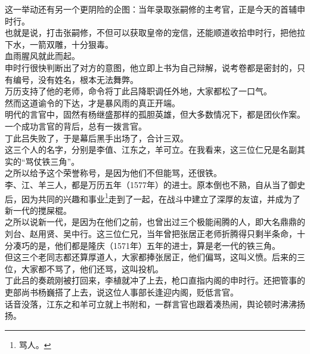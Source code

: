 \begin{multicols}{\theparacolNo}
这一举动还有另一个更阴险的企图：当年录取张嗣修的主考官，正是今天的首辅申时行。\\

也就是说，打击张嗣修，不但可以获取皇帝的宠信，还能顺道收拾申时行，把他拉下水，一箭双雕，十分狠毒。\\

血雨腥风就此而起。\\

申时行很快判断出了对方的意图，他立即上书为自己辩解，说考卷都是密封的，只有编号，没有姓名，根本无法舞弊。\\

万历支持了他的老师，命令将丁此吕降职调任外地，大家都松了一口气。\\

然而这道谕令的下达，才是暴风雨的真正开端。\\

明代的言官中，固然有杨继盛那样的孤胆英雄，但大多数情况下，都是团伙作案。一个成功言官的背后，总有一拨言官。\\

丁此吕失败了，于是幕后黑手出场了，合计三双。\\

这三个人的名字，分别是李值、江东之，羊可立。在我看来，这三位仁兄是名副其实的“骂仗铁三角”。\\

之所以给予这个荣誉称号，是因为他们不但能骂，还很铁。\\

李、江、羊三人，都是万历五年（1577年）的进士。原本倒也不熟，自从当了御史后，因为共同的兴趣和事业\footnote{骂人。}走到了一起，在战斗中建立了深厚的友谊，并成为了新一代的搅屎棍。\\

之所以说新一代，是因为在他们之前，也曾出过三个极能闹腾的人，即大名鼎鼎的刘台、赵用贤、吴中行。这三位仁兄，当年曾把张居正老师折腾得只剩半条命，十分凑巧的是，他们都是隆庆（1571年）五年的进士，算是老一代的铁三角。\\

但这三个老同志都还算厚道人，大家都捧张居正，他们偏骂，这叫义愤。后来的三位，大家都不骂了，他们还骂，这叫投机。\\

丁此吕的奏疏刚被打回来，李植就冲了上去，枪口直指内阁的申时行。还把管事的吏部尚书杨巍搭了上去，说这位人事部长逢迎内阁，贬低言官。\\

话音没落，江东之和羊可立就上书附和，一群言官也跟着凑热闹，舆论顿时沸沸扬扬。\\


\end{multicols}
